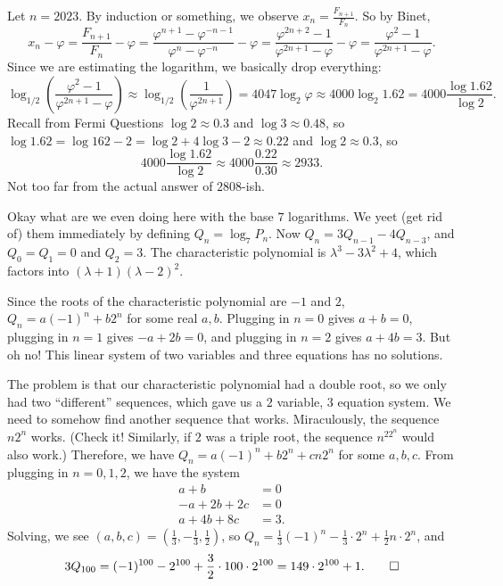 \documentclass[11pt]{scrartcl}
\begin{document}
\begin{solution}{}
    Let $n = 2023$. By induction or something, we observe $x_n = \frac{F_{n + 1}}{F_n}$. So by Binet,
    \[x_n - \varphi = \frac{F_{n + 1}}{F_n} - \varphi = \frac{\varphi^{n + 1} - \varphi^{-n - 1}}{\varphi^n - \varphi^{-n}} - \varphi = \frac{\varphi^{2n + 2} - 1}{\varphi^{2n + 1} - \varphi} - \varphi = \frac{\varphi^2 - 1}{\varphi^{2n + 1} - \varphi}.\]
    Since we are estimating the logarithm, we basically drop everything:
    \[\log_{1/2}\left( \frac{\varphi^2 - 1}{\varphi^{2n + 1} - \varphi} \right) \approx \log_{1/2}\left( \frac{1}{\varphi^{2n + 1}} \right) = 4047\log_2{\varphi} \approx 4000\log_2{1.62} = 4000\frac{\log 1.62}{\log 2}.\]
    Recall from Fermi Questions $\log 2 \approx 0.3$ and $\log 3 \approx 0.48$, so $\log 1.62 = \log 162 - 2 = \log 2 + 4\log 3 - 2 \approx 0.22$ and $\log 2 \approx 0.3$, so
    \[4000\frac{\log 1.62}{\log 2} \approx 4000\frac{0.22}{0.30} \approx 2933.\]
    Not too far from the actual answer of $2808$-ish.
\end{solution}

\begin{solution}{}
    Okay what are we even doing here with the base $7$ logarithms. We yeet (get rid of) them immediately by defining $Q_n = \log_7P_n$. Now $Q_n = 3Q_{n - 1} - 4Q_{n - 3}$, and $Q_0 = Q_1 = 0$ and $Q_2 = 3$. The characteristic polynomial is $\lambda^3 - 3\lambda^2 + 4$, which factors into $(\lambda + 1)(\lambda - 2)^2$.

    Since the roots of the characteristic polynomial are $-1$ and $2$, $Q_n = a(-1)^n + b2^n$ for some real $a,b$. Plugging in $n = 0$ gives $a + b = 0$, plugging in $n = 1$ gives $-a + 2b = 0$, and plugging in $n = 2$ gives $a + 4b = 3$. But oh no! This linear system of two variables and three equations has no solutions.

    The problem is that our characteristic polynomial had a double root, so we only had two ``different'' sequences, which gave us a $2$ variable, $3$ equation system. We need to somehow find another sequence that works. Miraculously, the sequence $n2^n$ works. (Check it! Similarly, if $2$ was a triple root, the sequence $n^22^n$ would also work.) Therefore, we have $Q_n = a(-1)^n + b2^n + cn2^n$ for some $a,b,c$. From plugging in $n = 0,1,2$, we have the system
    \begin{align*}
        a + b &= 0 \\
        -a + 2b + 2c &= 0 \\
        a + 4b + 8c &= 3.
    \end{align*}
    Solving, we see $(a,b,c) = (\frac13,-\frac13,\frac12)$, so $Q_n = \frac13(-1)^n - \frac13 \cdot 2^n + \frac12 n \cdot 2^n$, and
    \[3Q_{100} = (-1)^{100} - 2^{100} + \frac32 \cdot 100 \cdot 2^{100} = 149 \cdot 2^{100} + 1. \qedhere\]
\end{solution}
\end{document}
